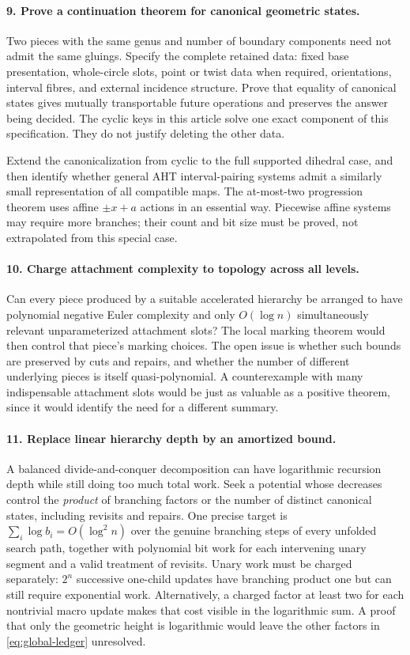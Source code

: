 \paragraph{9. Prove a continuation theorem for canonical geometric states.}
Two pieces with the same genus and number of boundary components need
not admit the same gluings. Specify the complete retained data: fixed
base presentation, whole-circle slots, point or twist data when required,
orientations, interval fibres, and external incidence structure.
Prove that equality of canonical states gives mutually transportable
future operations and preserves the answer being decided. The cyclic
keys in this article solve one exact component of this specification.
They do not justify deleting the other data.

Extend the canonicalization from cyclic to the full supported dihedral
case, and then identify whether general AHT interval-pairing systems admit
a similarly small representation of all compatible maps. The at-most-two
progression theorem uses affine $\pm x+a$ actions in an essential way.
Piecewise affine systems may require more branches; their count and
bit size must be proved, not extrapolated from this special case.

\paragraph{10. Charge attachment complexity to topology across all levels.}
Can every piece produced by a suitable accelerated hierarchy be arranged
to have polynomial negative Euler complexity and only $O(\log n)$
simultaneously relevant unparameterized attachment slots? The local
marking theorem would then control that piece's marking choices.
The open issue is whether such bounds are preserved by cuts and repairs,
and whether the number of different underlying pieces is itself
quasi-polynomial. A counterexample with many indispensable attachment
slots would be just as valuable as a positive theorem, since it would
identify the need for a different summary.

\paragraph{11. Replace linear hierarchy depth by an amortized bound.}
A balanced divide-and-conquer decomposition can have logarithmic
recursion depth while still doing too much total work. Seek a potential
whose decreases control the \emph{product} of branching factors or the
number of distinct canonical states, including revisits and repairs.
One precise target is
$\sum_i\log b_i=O(\log^2 n)$ over the genuine branching steps of every
unfolded search path, together with polynomial bit work for each
intervening unary segment and a valid treatment of revisits. Unary work
must be charged separately: $2^n$ successive one-child updates have
branching product one but can still require exponential work.
Alternatively, a charged factor at least two for each nontrivial macro
update makes that cost visible in the logarithmic sum. A proof that only
the geometric height is logarithmic would leave the other factors in
\eqref{eq:global-ledger} unresolved.

